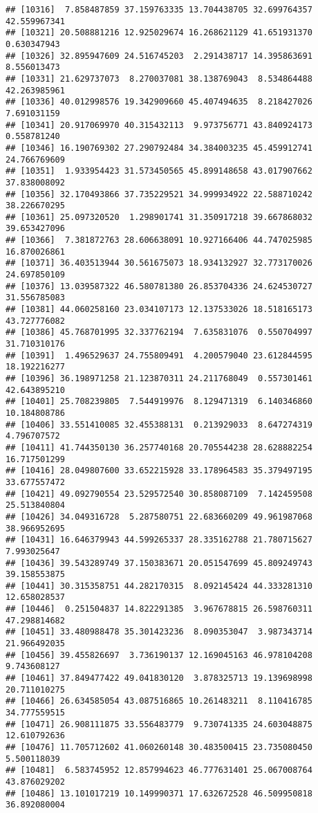 \documentclass[
]{article}
\begin{document}
\begin{verbatim}
## [10316]  7.858487859 37.159763335 13.704438705 32.699764357 42.559967341
## [10321] 20.508881216 12.925029674 16.268621129 41.651931370  0.630347943
## [10326] 32.895947609 24.516745203  2.291438717 14.395863691  8.556013473
## [10331] 21.629737073  8.270037081 38.138769043  8.534864488 42.263985961
## [10336] 40.012998576 19.342909660 45.407494635  8.218427026  7.691031159
## [10341] 20.917069970 40.315432113  9.973756771 43.840924173  0.558781240
## [10346] 16.190769302 27.290792484 34.384003235 45.459912741 24.766769609
## [10351]  1.933954423 31.573450565 45.899148658 43.017907662 37.838008092
## [10356] 32.170493866 37.735229521 34.999934922 22.588710242 38.226670295
## [10361] 25.097320520  1.298901741 31.350917218 39.667868032 39.653427096
## [10366]  7.381872763 28.606638091 10.927166406 44.747025985 16.870026861
## [10371] 36.403513944 30.561675073 18.934132927 32.773170026 24.697850109
## [10376] 13.039587322 46.580781380 26.853704336 24.624530727 31.556785083
## [10381] 44.060258160 23.034107173 12.137533026 18.518165173 43.727776082
## [10386] 45.768701995 32.337762194  7.635831076  0.550704997 31.710310176
## [10391]  1.496529637 24.755809491  4.200579040 23.612844595 18.192216277
## [10396] 36.198971258 21.123870311 24.211768049  0.557301461 42.643895210
## [10401] 25.708239805  7.544919976  8.129471319  6.140346860 10.184808786
## [10406] 33.551410085 32.455388131  0.213929033  8.647274319  4.796707572
## [10411] 41.744350130 36.257740168 20.705544238 28.628882254 16.717501299
## [10416] 28.049807600 33.652215928 33.178964583 35.379497195 33.677557472
## [10421] 49.092790554 23.529572540 30.858087109  7.142459508 25.513840804
## [10426] 34.049316728  5.287580751 22.683660209 49.961987068 38.966952695
## [10431] 16.646379943 44.599265337 28.335162788 21.780715627  7.993025647
## [10436] 39.543289749 37.150383671 20.051547699 45.809249743 39.158553875
## [10441] 30.315358751 44.282170315  8.092145424 44.333281310 12.658028537
## [10446]  0.251504837 14.822291385  3.967678815 26.598760311 47.298814682
## [10451] 33.480988478 35.301423236  8.090353047  3.987343714 21.966492035
## [10456] 39.455826697  3.736190137 12.169045163 46.978104208  9.743608127
## [10461] 37.849477422 49.041830120  3.878325713 19.139698998 20.711010275
## [10466] 26.634585054 43.087516865 10.261483211  8.110416785 34.777559515
## [10471] 26.908111875 33.556483779  9.730741335 24.603048875 12.610792636
## [10476] 11.705712602 41.060260148 30.483500415 23.735080450  5.500118039
## [10481]  6.583745952 12.857994623 46.777631401 25.067008764 43.876029202
## [10486] 13.101017219 10.149990371 17.632672528 46.509950818 36.892080004

\end{verbatim}
\end{document}
